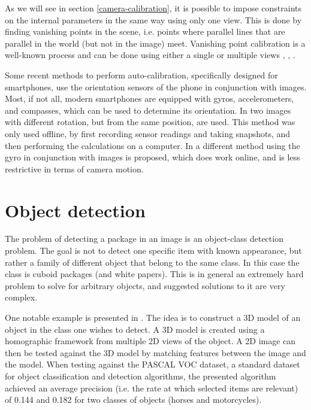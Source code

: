 As we will see in section \ref{camera-calibration}, it is possible to impose constraints on the internal parameters in the same way using only one view.
This is done by finding vanishing points in the scene, i.e. points where parallel lines that are parallel in the world (but not in the image) meet.
Vanishing point calibration is a well-known process and can be done using either a single or multiple views \cite{guillou2000using}, \cite[195-226]{hartley-zisserman}, \cite{caprile1990using}.

Some recent methods to perform auto-calibration, specifically designed for smartphones, use the orientation sensors of the phone in conjunction with images.
Most, if not all, modern  smartphones are equipped with gyros, accelerometers, and compasses, which can be used to determine its orientation.
In \cite{saponaro2013towards} two images with different rotation, but from the same position, are used.
This method was only used offline, by first recording sensor readings and taking snapshots, and then performing the calculations on a computer.
In \cite{jia2014online} a different method using the gyro in conjunction with images is proposed, which does work online, and is less restrictive in terms of camera motion.

\section{Object detection}
The problem of detecting a package in an image is an object-class detection problem.
The goal is not to detect one specific item with known appearance, but rather a family of different object that belong to the same class.
In this case the class is cuboid packages (and white papers).
This is in general an extremely hard problem to solve for arbitrary objects, and suggested solutions to it are very complex.

One notable example is presented in \cite{yan20073d}. The idea is to construct a 3D model of an object in the class one wishes to detect.
A 3D model is created using a homographic framework from  multiple 2D views of the object.
A 2D image can then be tested against the 3D model by matching features between the image and the model. 
When testing against the PASCAL VOC dataset, a standard dataset for object classification and detection algorithms, the presented algorithm achieved an average precision (i.e. the rate at which selected items are relevant) of 0.144 and 0.182 for two classes of objects (horses and motorcycles). 

